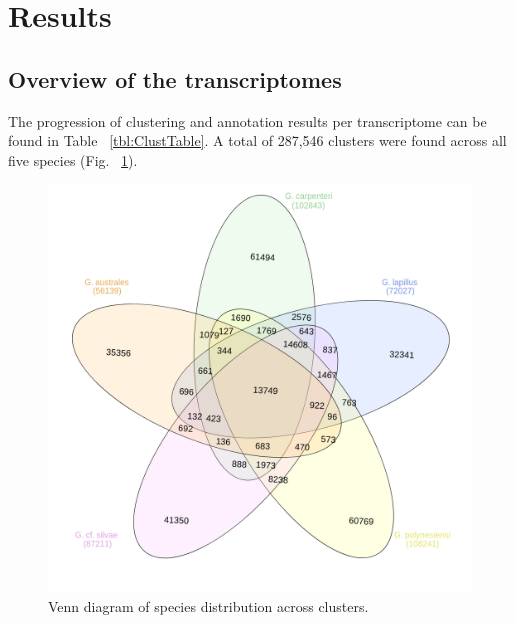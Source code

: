 \documentclass[12pt]{article}
\begin{document}
\newpage
\section{Results}
\FloatBarrier
\subsection{Overview of the transcriptomes}
The progression of clustering and annotation results per transcriptome can be found in Table ~\ref{tbl:ClustTable}. 
A total of 287,546 clusters were found across all five species (Fig. ~\ref{fig:SpeciesVenn}). 


\begin{figure} 
\includegraphics[scale=.4]{3Aug18_cluster-investigation/Species-venn.png} 
\caption{Venn diagram of species distribution across clusters.} 
\label{fig:SpeciesVenn}
\end{figure} 
\end{document}
